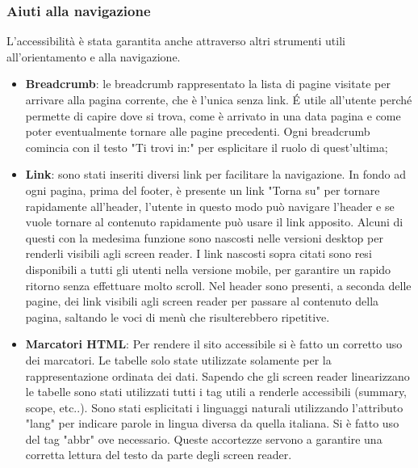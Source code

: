 \subsubsection{Aiuti alla navigazione}
 L'accessibilità è stata garantita anche attraverso altri strumenti utili all'orientamento e alla navigazione.
 \begin{itemize}
     \item \textbf{Breadcrumb}: le breadcrumb rappresentato la lista di pagine visitate per arrivare alla pagina corrente, che è l'unica senza link. É utile all'utente perché permette di capire dove si trova, come è arrivato in una data pagina e come poter eventualmente tornare alle pagine precedenti. Ogni breadcrumb comincia con il testo "Ti trovi in:" per esplicitare il ruolo di quest'ultima;
     \item \textbf{Link}: sono stati inseriti diversi link per facilitare la navigazione. In fondo ad ogni pagina, prima del footer, è presente un link "Torna su" per tornare rapidamente all'header, l'utente in questo modo può navigare l'header e se vuole tornare al contenuto rapidamente può usare il link apposito. Alcuni di questi con la medesima funzione sono nascosti nelle versioni desktop per renderli visibili agli screen reader. 
     I link nascosti sopra citati sono resi disponibili a tutti gli utenti nella versione mobile, per garantire un rapido ritorno senza effettuare molto scroll.
     Nel header sono presenti, a seconda delle pagine, dei link visibili agli screen reader per passare al contenuto della pagina, saltando le voci di menù che risulterebbero ripetitive.
     \item \textbf{Marcatori HTML}: Per rendere il sito accessibile si è fatto un corretto uso dei marcatori.
     Le tabelle solo state utilizzate solamente per la rappresentazione ordinata dei dati. Sapendo che gli screen reader linearizzano le tabelle sono stati utilizzati tutti i tag utili a renderle accessibili (summary, scope, etc..). Sono stati esplicitati i linguaggi naturali utilizzando l'attributo "lang" per indicare parole in lingua diversa da quella italiana. Si è fatto uso del tag "abbr" ove necessario. Queste accortezze servono a garantire una corretta lettura del testo da parte degli screen reader.
 \end{itemize}
